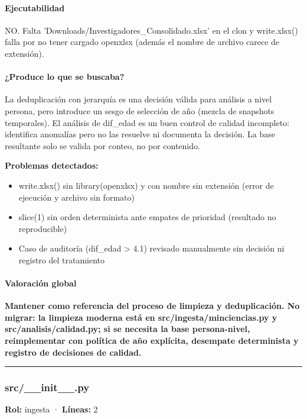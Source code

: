 \paragraph{Ejecutabilidad}
NO. Falta 'Downloads/Investigadores\_Consolidado.xlsx' en el clon y write.xlsx() falla por no tener cargado openxlsx (además el nombre de archivo carece de extensión).

\paragraph{¿Produce lo que se buscaba?}
La deduplicación con jerarquía es una decisión válida para análisis a nivel persona, pero introduce un sesgo de selección de año (mezcla de snapshots temporales). El análisis de dif\_edad es un buen control de calidad incompleto: identifica anomalías pero no las resuelve ni documenta la decisión. La base resultante solo se valida por conteo, no por contenido.

\begin{tcolorbox}[riesgo]
\textbf{Problemas detectados:}
\begin{itemize}
  \item write.xlsx() sin library(openxlsx) y con nombre sin extensión (error de ejecución y archivo sin formato)
  \item slice(1) sin orden determinista ante empates de prioridad (resultado no reproducible)
  \item Caso de auditoría (dif\_edad > 4.1) revisado manualmente sin decisión ni registro del tratamiento
\end{itemize}
\end{tcolorbox}

\paragraph{Valoración global}
\textbf{Mantener como referencia del proceso de limpieza y deduplicación. No migrar: la limpieza moderna está en src/ingesta/minciencias.py y src/analisis/calidad.py; si se necesita la base persona-nivel, reimplementar con política de año explícita, desempate determinista y registro de decisiones de calidad.}

\medskip
\hrule

\subsubsection{src/\_\_init\_\_.py}
\textbf{Rol:} ingesta · \textbf{Líneas:} 2

